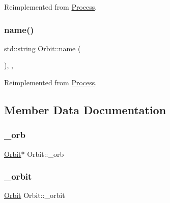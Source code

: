 Reimplemented from \hyperlink{class_process_a95b98841ab13370d0d6b4841a4a94202}{Process}.

\mbox{\label{class_orbit_a37095e757de4e80b3a49ad8c03335568}} 
\subsubsection{\texorpdfstring{name()}{name()}}
{\footnotesize\ttfamily std\+::string Orbit\+::name (\begin{DoxyParamCaption}{ }\end{DoxyParamCaption})\hspace{0.3cm}{\ttfamily [inline]}, {\ttfamily [override]}, {\ttfamily [virtual]}}



Reimplemented from \hyperlink{class_process_a1c19334f4e746d3410e4cfad66053035}{Process}.



\subsection{Member Data Documentation}
\mbox{\label{class_orbit_a7a6992542c4bdfa762d04ebbe68465a4}} 
\subsubsection{\texorpdfstring{\+\_\+orb}{\_orb}}
{\footnotesize\ttfamily \hyperlink{class_orbit}{Orbit}$\ast$ Orbit\+::\+\_\+orb\hspace{0.3cm}{\ttfamily [private]}}

\mbox{\label{class_orbit_ac3423be9e8290c03b5656e9a09786f17}} 
\subsubsection{\texorpdfstring{\+\_\+orbit}{\_orbit}}
{\footnotesize\ttfamily \hyperlink{class_orbit}{Orbit} Orbit\+::\+\_\+orbit\hspace{0.3cm}{\ttfamily [static]}}

\mbox{\label{class_orbit_a80f7d9179bd6ca0be8cf8c4b8f06c88e}} 
